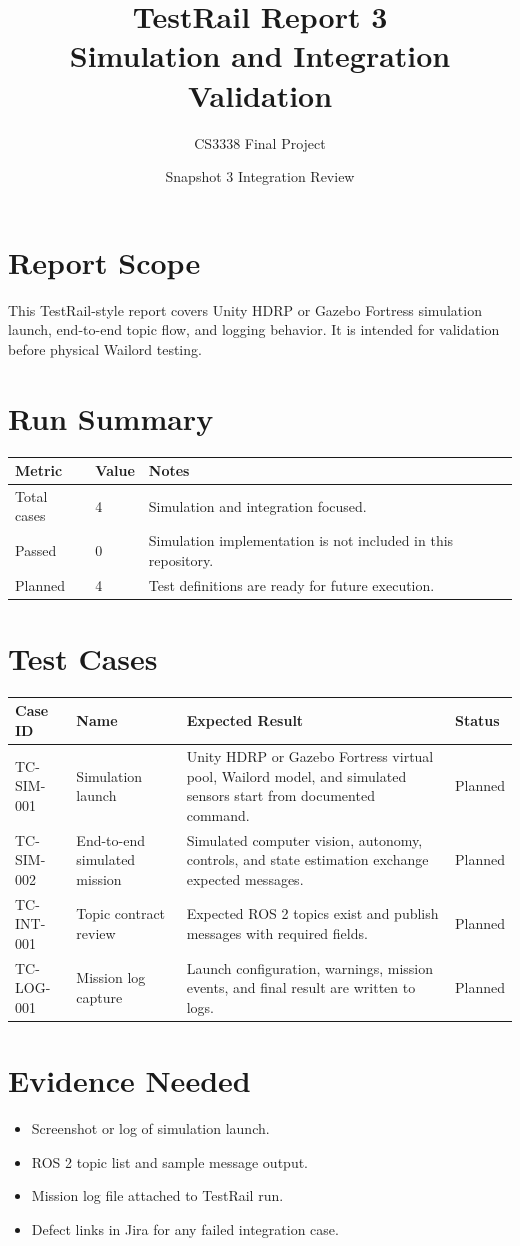 \documentclass[12pt]{article}
\title{TestRail Report 3\\Simulation and Integration Validation}
\author{CS3338 Final Project}
\date{Snapshot 3 Integration Review}
\begin{document}
\maketitle

\section{Report Scope}
This TestRail-style report covers Unity HDRP or Gazebo Fortress simulation launch, end-to-end topic flow, and logging behavior. It is intended for validation before physical Wailord testing.

\section{Run Summary}
\begin{longtable}{|p{}|p{}|p{}|}
\hline
\textbf{Metric} & \textbf{Value} & \textbf{Notes} \\
\hline
Total cases & 4 & Simulation and integration focused. \\
\hline
Passed & 0 & Simulation implementation is not included in this repository. \\
\hline
Planned & 4 & Test definitions are ready for future execution. \\
\hline
\end{longtable}

\section{Test Cases}
\begin{longtable}{|p{}|p{}|p{}|p{}|}
\hline
\textbf{Case ID} & \textbf{Name} & \textbf{Expected Result} & \textbf{Status} \\
\hline
TC-SIM-001 & Simulation launch & Unity HDRP or Gazebo Fortress virtual pool, Wailord model, and simulated sensors start from documented command. & Planned \\
\hline
TC-SIM-002 & End-to-end simulated mission & Simulated computer vision, autonomy, controls, and state estimation exchange expected messages. & Planned \\
\hline
TC-INT-001 & Topic contract review & Expected ROS 2 topics exist and publish messages with required fields. & Planned \\
\hline
TC-LOG-001 & Mission log capture & Launch configuration, warnings, mission events, and final result are written to logs. & Planned \\
\hline
\end{longtable}

\section{Evidence Needed}
\begin{itemize}[leftmargin=*]
  \item Screenshot or log of simulation launch.
  \item ROS 2 topic list and sample message output.
  \item Mission log file attached to TestRail run.
  \item Defect links in Jira for any failed integration case.
\end{itemize}
\end{document}
